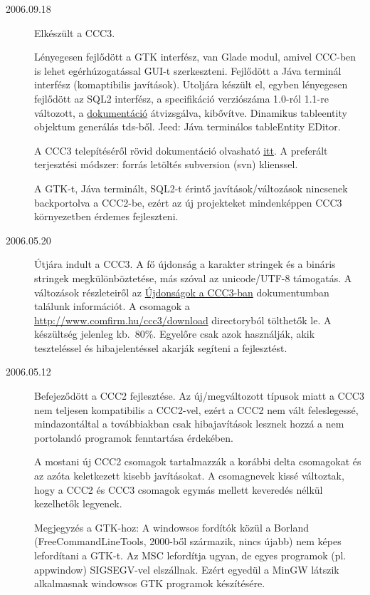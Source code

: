 \begin{description}
\label{20060918}
\item[2006.09.18]
  Elkészült a CCC3. 

  Lényegesen fejlődött a GTK interfész, van Glade modul,
  amivel CCC-ben is lehet egérhúzogatással GUI-t szerkeszteni.
  Fejlődött a Jáva terminál interfész (komaptibilis javítások).
  Utoljára készült el, egyben lényegesen fejlődött az SQL2 interfész,
  a specifikáció verziószáma 1.0-ról 1.1-re változott,   a 
  \href{sql2.html}{dokumentáció} átvizsgálva, kibővítve.
  Dinamikus tableentity objektum generálás tds-ből.
  Jeed: Jáva terminálos tableEntity EDitor.
  
  A CCC3 telepítéséről rövid dokumentáció olvasható 
  \href{http://ccc.comfirm.hu./ccc3/download/olvass.html}{itt}.
  A preferált terjesztési módszer: forrás letöltés subversion 
  (svn) klienssel.
  
  A GTK-t, Jáva terminált, SQL2-t érintő javítások/változások
  nincsenek backportolva a CCC2-be, ezért az új projekteket 
  mindenképpen CCC3 környezetben érdemes fejleszteni.

\label{20060520}
\item[2006.05.20]
  Útjára indult a CCC3.
  A fő újdonság a karakter stringek 
  és a bináris stringek megkülönböztetése,
  más szóval az unicode/UTF-8 támogatás.
  A változások részleteiről az
  \href{ccc3_ujdonsagok.html}{Újdonságok a CCC3-ban}
  dokumentumban találunk információt.
  A csomagok a 
  \href{http://www.comfirm.hu/ccc3/download}{http://www.comfirm.hu/ccc3/download}
  directoryból tölthetők le. A készültség jelenleg kb.~80\%.
  Egyelőre csak azok használják, akik teszteléssel és hibajelentéssel
  akarják segíteni a fejlesztést.


\label{20060512}
\item[2006.05.12]

  Befejeződött a CCC2 fejlesztése.
  Az új/megváltozott típusok miatt a CCC3 nem teljesen 
  kompatibilis a CCC2-vel, ezért a CCC2 nem vált feleslegessé,
  mindazontáltal a továbbiakban csak hibajavítások lesznek hozzá
  a nem portolandó programok fenntartása érdekében.

  A mostani új CCC2 csomagok tartalmazzák a korábbi delta csomagokat
  és az azóta keletkezett kisebb javításokat. A csomagnevek
  kissé változtak, hogy a CCC2 és CCC3  csomagok egymás mellett
  keveredés nélkül kezelhetők legyenek.

  Megjegyzés a GTK-hoz: A windowsos fordítók közül a Borland
  (FreeCommandLineTools, 2000-ből származik, nincs újabb) nem képes 
  lefordítani a GTK-t. Az MSC lefordítja ugyan, de egyes programok 
  (pl. appwindow) SIGSEGV-vel elszállnak. Ezért egyedül a MinGW 
  látszik alkalmasnak windowsos GTK programok készítésére.


\end{description}
